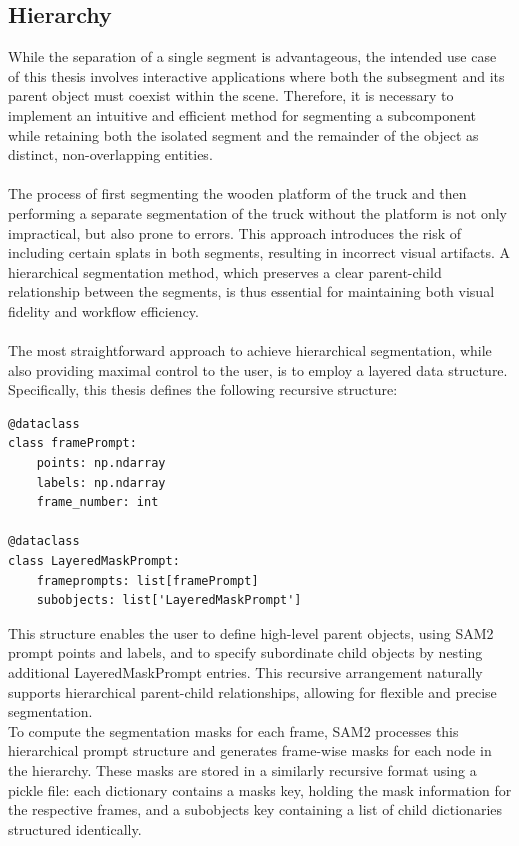 \documentclass[12pt]{article}
\begin{document}
\subsection{Hierarchy}
While the separation of a single segment is advantageous, the intended use case of this thesis involves interactive applications where both the subsegment and its parent object must coexist within the scene. Therefore, it is necessary to implement an intuitive and efficient method for segmenting a subcomponent while retaining both the isolated segment and the remainder of the object as distinct, non-overlapping entities.
\\\\
The process of first segmenting the wooden platform of the truck and then performing a separate segmentation of the truck without the platform is not only impractical, but also prone to errors. This approach introduces the risk of including certain splats in both segments, resulting in incorrect visual artifacts. A hierarchical segmentation method, which preserves a clear parent-child relationship between the segments, is thus essential for maintaining both visual fidelity and workflow efficiency.
\\\\
The most straightforward approach to achieve hierarchical segmentation, while also providing maximal control to the user, is to employ a layered data structure. Specifically, this thesis defines the following recursive structure:
\begin{lstlisting}[tabsize=2,caption=Definition of the recursive data structure used to represent hierarchical segmentation prompts and their relationships in SAM2, label=code:recursivedata,breaklines=true,breakatwhitespace=true,basicstyle=\ttfamily\footnotesize]
@dataclass
class framePrompt:
	points: np.ndarray
	labels: np.ndarray
	frame_number: int

@dataclass
class LayeredMaskPrompt:
	frameprompts: list[framePrompt]
	subobjects: list['LayeredMaskPrompt']
\end{lstlisting}
This structure enables the user to define high-level parent objects, using SAM2 prompt points and labels, and to specify subordinate child objects by nesting additional LayeredMaskPrompt entries. This recursive arrangement naturally supports hierarchical parent-child relationships, allowing for flexible and precise segmentation.
\\
To compute the segmentation masks for each frame, SAM2 processes this hierarchical prompt structure and generates frame-wise masks for each node in the hierarchy. These masks are stored in a similarly recursive format using a pickle file: each dictionary contains a masks key, holding the mask information for the respective frames, and a subobjects key containing a list of child dictionaries structured identically.
\end{document}
